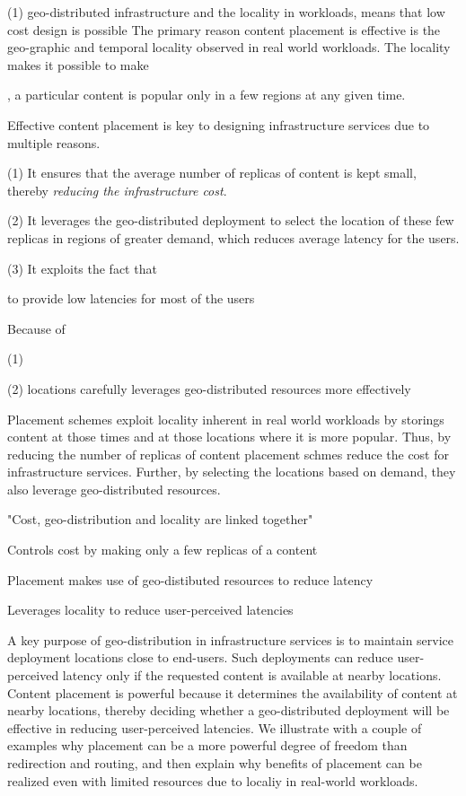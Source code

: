 (1) geo-distributed infrastructure and the locality in workloads,
means that low cost design is possible 
The primary reason content placement is effective is the geo-graphic and temporal locality observed in real world workloads. The locality makes it possible to make 

, a particular content is popular only in a few regions at any given time. 

Effective content placement is key to designing infrastructure services due to multiple reasons. 

(1) It ensures that the average number of replicas of content is kept small, thereby \emph{reducing the infrastructure cost}.

(2) It leverages the geo-distributed deployment to select the location of these few replicas in regions of greater demand, which reduces average latency for the users.

(3) It exploits the fact that 

 to provide low latencies for most of the users

Because of 

(1) 

(2) locations carefully leverages geo-distributed resources more effectively 




Placement schemes exploit locality inherent in real world workloads by storings content at those times and at those locations where it is more popular. Thus, by reducing the number of replicas of content placement schmes reduce the cost for infrastructure services. Further, by selecting the locations based on demand, they also leverage geo-distributed resources. 


"Cost, geo-distribution and locality are linked together"



Controls cost by making only a few replicas of a content



Placement makes use of geo-distibuted resources to reduce latency


Leverages locality to reduce user-perceived latencies




A key purpose of geo-distribution in infrastructure services is to maintain service deployment locations close to end-users.  Such deployments can reduce user-perceived latency only if the requested content is available at nearby locations. Content placement is powerful because it determines the availability of content at nearby locations, thereby deciding whether a geo-distributed deployment will be effective in reducing user-perceived latencies. We illustrate with a couple of examples why placement can be a more powerful degree of freedom than redirection and routing, and then explain why benefits of placement can be realized even with limited resources due to localiy in real-world workloads. 

